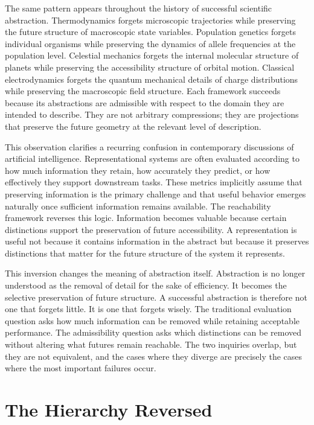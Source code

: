 \documentclass[12pt,a4paper]{article}
\theoremstyle{plain}
\theoremstyle{definition}
\theoremstyle{remark}
\begin{document}
The same pattern appears throughout the history of successful scientific
abstraction. Thermodynamics forgets microscopic trajectories while preserving
the future structure of macroscopic state variables. Population genetics
forgets individual organisms while preserving the dynamics of allele
frequencies at the population level. Celestial mechanics forgets the internal
molecular structure of planets while preserving the accessibility structure
of orbital motion. Classical electrodynamics forgets the quantum mechanical
details of charge distributions while preserving the macroscopic field
structure. Each framework succeeds because its abstractions are admissible
with respect to the domain they are intended to describe. They are not
arbitrary compressions; they are projections that preserve the future
geometry at the relevant level of description.

This observation clarifies a recurring confusion in contemporary discussions
of artificial intelligence. Representational systems are often evaluated
according to how much information they retain, how accurately they predict,
or how effectively they support downstream tasks. These metrics implicitly
assume that preserving information is the primary challenge and that useful
behavior emerges naturally once sufficient information remains available.
The reachability framework reverses this logic. Information becomes valuable
because certain distinctions support the preservation of future
accessibility. A representation is useful not because it contains information
in the abstract but because it preserves distinctions that matter for the
future structure of the system it represents.

This inversion changes the meaning of abstraction itself. Abstraction is no
longer understood as the removal of detail for the sake of efficiency. It
becomes the selective preservation of future structure. A successful
abstraction is therefore not one that forgets little. It is one that forgets
wisely. The traditional evaluation question asks how much information can be
removed while retaining acceptable performance. The admissibility question
asks which distinctions can be removed without altering what futures remain
reachable. The two inquiries overlap, but they are not equivalent, and the
cases where they diverge are precisely the cases where the most important
failures occur.

\section{The Hierarchy Reversed}
\end{document}
